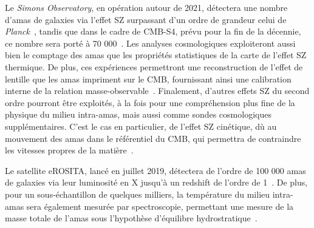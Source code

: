 Le \emph{Simons Observatory}, en opération autour de 2021, détectera
une nombre d'amas de galaxies via l'effet SZ surpassant d'un ordre de
grandeur celui de \emph{Planck}~\citep{SO2019}, tandis que dans le
cadre de CMB-S4, prévu pour la fin de la décennie, ce nombre sera
porté à 70 000~\citep{CMB-S4}. Les analyses cosmologiques exploiteront
aussi bien le comptage des amas que les propriétés statistiques de la
carte de l'effet SZ thermique. De plus, ces expériences permettront
une reconstruction de l'effet de lentille que les amas impriment sur
le CMB, fournissant ainsi une calibration interne de la relation
masse-observable~\citep{Melin2015, Louis2017}. Finalement, d'autres
effets SZ du second ordre pourront être exploités, à la fois pour une
compréhension plus fine de la physique du milieu intra-amas, mais
aussi comme sondes cosmologiques supplémentaires. C'est le cas en
particulier, de l'effet SZ cinétique, dù au mouvement des amas dans le
référentiel du CMB, qui permettra de contraindre les vitesses propres
de la matière~\citep{SO2019}.


Le satellite eROSITA, lancé en juillet 2019, détectera de l'ordre de
100 000 amas de galaxies via leur luminosité en X jusqu'à un redshift de
l'ordre de 1~\citep{eROSITA_cosmo}. De plus,
pour un sous-échantillon de quelques milliers, la température du
milieu intra-amas sera également mesurée par spectroscopie, permettant
une mesure de la masse totale de l'amas sous l'hypothèse d'équilibre
hydrostratique~\citep{Hofmann2017}.   

